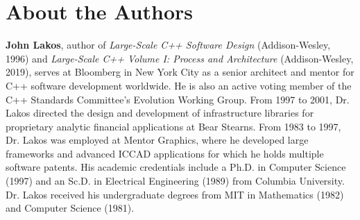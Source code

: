 \cleardoublepage
\chapter*{About the Authors}


\noindent \textbf{John Lakos}, author of \textit{Large-Scale C++ Software Design} (Addison-Wesley, 1996) and \textit{Large-Scale C++ Volume I: Process and Architecture} (Addison-Wesley, 2019), serves at Bloomberg in New York City as a senior architect and mentor for C++ software development worldwide. He is also an active voting member of the C++ Standards Committee’s Evolution Working Group. From 1997 to 2001, Dr. Lakos directed the design and development of infrastructure libraries for proprietary analytic financial applications at Bear Stearns. From 1983 to 1997, Dr. Lakos was employed at Mentor Graphics, where he developed large frameworks and advanced ICCAD applications for which he holds multiple software patents. His academic credentials include a Ph.D. in Computer Science (1997) and an Sc.D. in Electrical Engineering (1989) from Columbia University. Dr. Lakos received his undergraduate degrees from MIT in Mathematics (1982) and Computer Science (1981).  

